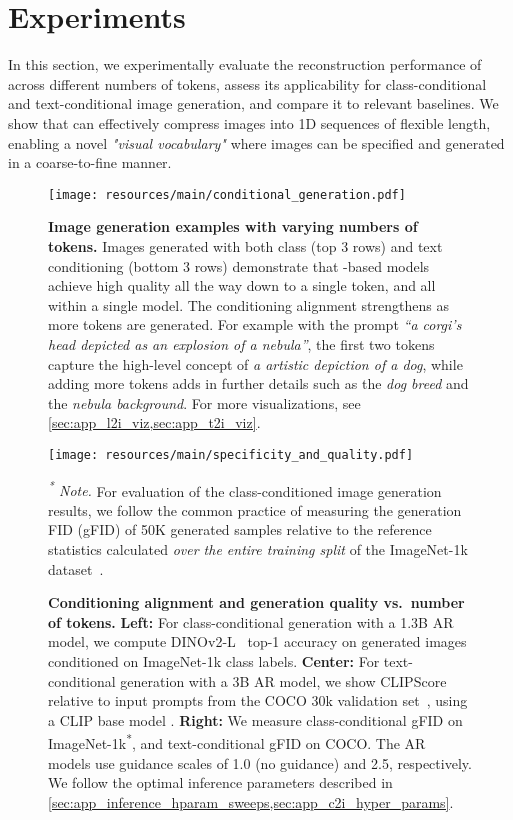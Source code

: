 \section{Experiments} 
\label{sec:experiments}
In this section, we experimentally evaluate the reconstruction performance of \ours across different numbers of tokens, assess its applicability for class-conditional and text-conditional image generation, and compare it to relevant baselines. We show that \ours can effectively compress images into 1D sequences of flexible length, enabling a novel \textit{"visual vocabulary"} where images can be specified and generated in a coarse-to-fine manner.

\begin{figure*}[ht!]
\centering
\texttt{[image: resources/main/conditional\_generation.pdf]}
\caption{
\textbf{Image generation examples with varying numbers of tokens.}
Images generated with both class (top 3 rows) and text conditioning (bottom 3 rows) demonstrate that \ours-based models achieve high quality all the way down to a single token, and all within a single model. The conditioning alignment strengthens as more tokens are generated. For example with the prompt \textit{``a corgi's head depicted as an explosion of a nebula''}, the first two tokens capture the high-level concept of \textit{a artistic depiction of a dog}, while adding more tokens adds in further details such as the \textit{dog breed} and the \textit{nebula background}. For more visualizations, see \cref{sec:app_l2i_viz,sec:app_t2i_viz}.
}
\label{fig:gen_samples}
\end{figure*}

\begin{figure*}[ht!]
\centering
\texttt{[image: resources/main/specificity\_and\_quality.pdf]}
\caption{
\textbf{Conditioning alignment and generation quality vs.\ number of tokens.}
\textbf{Left:} For class-conditional generation with a 1.3B AR model,
we compute DINOv2-L~\cite{Oquab2023DINOv2} top-1 accuracy
on generated images conditioned on ImageNet-1k class labels.
\textbf{Center:} For text-conditional generation with a 3B AR model,
we show CLIPScore relative to input prompts from the COCO 30k validation set~\cite{ms_coco_dataset},
using a CLIP base model .
\textbf{Right:} We measure class-conditional gFID on ImageNet-1k\textsuperscript{*},
and text-conditional gFID on COCO.
The AR models use guidance scales of 1.0 (no guidance) and 2.5, respectively. We follow the optimal inference parameters described in
\cref{sec:app_inference_hparam_sweeps,sec:app_c2i_hyper_params}.
}
\label{fig:specificity_vs_num_tokens}
\vspace{0.5em}  %
\begin{minipage}{0.95\textwidth}
\footnotesize
\textit{\textsuperscript{*} Note.} For evaluation of the class-conditioned image generation results,
we follow the common practice of measuring the generation FID (gFID) of 50K generated samples
relative to the reference statistics calculated \textit{over the entire training split} of the 
ImageNet-1k dataset~\cite{dhariwal2021diffusion}.
\end{minipage}
\end{figure*}

